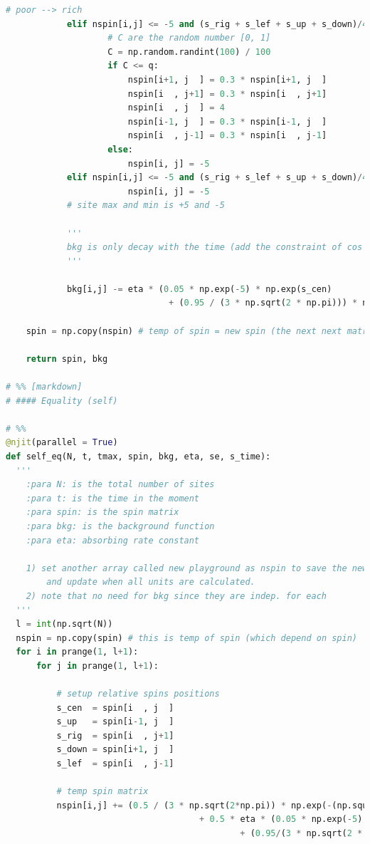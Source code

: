 \documentclass[10pt]{article}
\begin{document}
\begin{lstlisting}[language={Python}]
            # poor --> rich
            elif nspin[i,j] <= -5 and (s_rig + s_lef + s_up + s_down)/4 < -4:
                    # C are the random number [0, 1]
                    C = np.random.randint(100) / 100
                    if C <= q:
                        nspin[i+1, j  ] = 0.3 * nspin[i+1, j  ] 
                        nspin[i  , j+1] = 0.3 * nspin[i  , j+1]
                        nspin[i  , j  ] = 4
                        nspin[i-1, j  ] = 0.3 * nspin[i-1, j  ]
                        nspin[i  , j-1] = 0.3 * nspin[i  , j-1]
                    else:
                        nspin[i, j] = -5    
            elif nspin[i,j] <= -5 and (s_rig + s_lef + s_up + s_down)/4 >= -4:
                        nspin[i, j] = -5
            # site max and min is +5 and -5

            '''
            bkg is only decay with the time (add the constraint of cos finction with the period t_max)
            '''      

            bkg[i,j] -= eta * (0.05 * np.exp(-5) * np.exp(s_cen) 
                                + (0.95 / (3 * np.sqrt(2 * np.pi))) * np.exp(-np.square(s_cen)/(2 * np.square(3)))) * bkg[i,j] * np.sin(2 * np.pi * t/tmax)

    spin = np.copy(nspin) # temp of spin = new spin (the next next matrix)

    return spin, bkg

# %% [markdown]
# #### Equality (self)

# %%
@njit(parallel = True)
def self_eq(N, t, tmax, spin, bkg, eta, se, s_time):
  '''
    :para N: is the total number of sites
    :para t: is the time in the moment
    :para spin: is the spin matrix
    :para bkg: is the background function
    :para eta: absorbing rate constant

    1) set another array called new playground as nspin to save the new Hierarchy, 
        and update when all units are calculated.
    2) note that no need for bkg since they are indep. for each
  '''
  l = int(np.sqrt(N))
  nspin = np.copy(spin) # this is temp of spin (which depend on spin)
  for i in prange(1, l+1):
      for j in prange(1, l+1):

          # setup relative spins positions
          s_cen  = spin[i  , j  ]
          s_up   = spin[i-1, j  ]
          s_rig  = spin[i  , j+1]
          s_down = spin[i+1, j  ]
          s_lef  = spin[i  , j-1]

          # temp spin matrix
          nspin[i,j] += (0.5 / (3 * np.sqrt(2*np.pi)) * np.exp(-(np.square(s_cen)/(2 * np.square(3)))) * (-(4*s_cen - s_rig -s_lef - s_up - s_down))
                                      + 0.5 * eta * (0.05 * np.exp(-5) * np.exp(s_cen)
                                              + (0.95/(3 * np.sqrt(2 * np.pi))) * np.exp(-np.square(s_cen)/(2 * np.square(3)))) * bkg[i,j] * np.sin(2 * np.pi * t/tmax))


\end{lstlisting}
\end{document}
